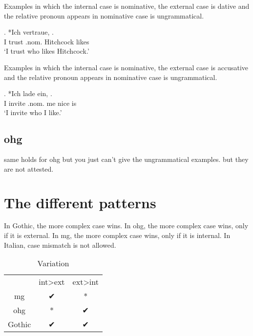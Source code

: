 Examples in which the internal case is nominative, the external case is dative and the relative pronoun appears in nominative case is ungrammatical.

\exg. *Ich vertraue,   .\\
 I trust\scsub{[dat]} .\ac{nom}. Hitchcock likes\scsub{[nom]}\\
 `I trust who likes Hitchcock.' 

Examples in which the internal case is nominative, the external case is accusative and the relative pronoun appears in nominative case is ungrammatical.

\exg. *Ich {lade ein},    .\\
 I invite\scsub{[acc]} .\ac{nom}. me nice is\scsub{[nom]}\\
 `I invite who I like.' 




\subsection{\ac{ohg}}

same holds for \ac{ohg} but you just can't give the ungrammatical examples. but they are not attested.



\section{The different patterns}

In Gothic, the more complex case wins.
In \ac{ohg}, the more complex case wins, only if it is external.
In \ac{mg}, the more complex case wins, only if it is internal.
In Italian, case mismatch is not allowed.


\begin{table}[H]
	\center
	\caption {Variation}
		\begin{tabular}{ccc}
		\toprule
		 					& \ac{int}>\ac{ext}		& \ac{ext}>\ac{int}	\\
								\cmidrule{2-3}
		\ac{mg} 	& ✔			 							&	*									\\
		\ac{ohg}	& *										&	✔									\\
		Gothic		&	✔										&	✔									\\
		\bottomrule
		\end{tabular}
\end{table}



